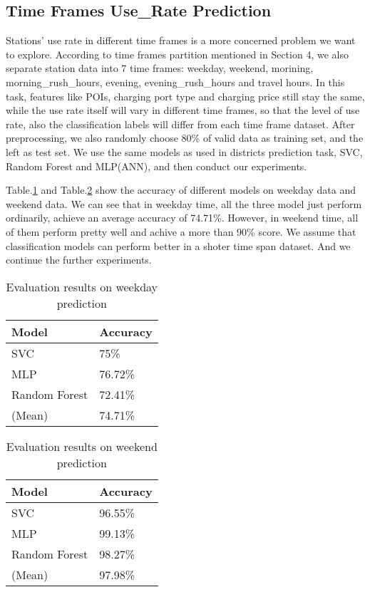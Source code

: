 \subsection{Time Frames Use\_Rate Prediction}
Stations' use rate in different time frames is a more concerned problem we want to explore. According to time frames partition mentioned in Section 4, we also separate station data into 7 time frames: weekday, weekend, morining, morning\_rush\_hours, evening, evening\_rush\_hours and travel hours. In this task, features like POIs, charging port type and charging price still stay the same, while the use rate itself will vary in different time frames, so that the level of use rate, also the classification labels will differ from each time frame dataset. After preprocessing, we also randomly choose 80\% of valid data as training set, and the left as test set. We use the same models as used in districts prediction task, SVC, Random Forest and MLP(ANN), and then conduct our experiments.

Table.\ref{tab4} and Table.\ref{tab5} show the accuracy of different models on weekday data and weekend data. We can see that in weekday time, all the three model just perform ordinarily, achieve an average accuracy of 74.71\%. However, in weekend time, all of them perform pretty well and achive a more than 90\% score. We assume that classification models can perform better in a shoter time span dataset. And we continue the further experiments.
\begin{table}[htbp]
	\caption{Evaluation results on weekday prediction}
	\begin{center}
		\begin{tabular}{|l|l|}
			\hline
			Model & Accuracy\\
			\hline
			SVC & 75\%\\
			\hline
			MLP & 76.72\%\\
			\hline
			Random Forest & 72.41\%\\
			\hline
			(Mean) & 74.71\%\\
			\hline
		\end{tabular}
		\label{tab4}
	\end{center}
\end{table}

\begin{table}[htbp]
	\caption{Evaluation results on weekend prediction}
	\begin{center}
		\begin{tabular}{|l|l|}
			\hline
			Model & Accuracy\\
			\hline
			SVC & 96.55\%\\
			\hline
			MLP & 99.13\%\\
			\hline
			Random Forest & 98.27\%\\
			\hline
			(Mean) & 97.98\%\\
			\hline
		\end{tabular}
		\label{tab5}
	\end{center}
\end{table}

